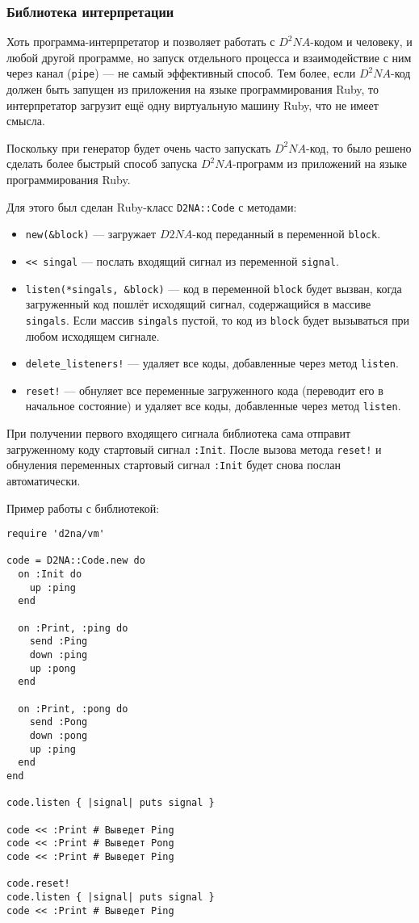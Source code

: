 \documentclass[utf8,a5paper,portrait,12pt]{eskdtext}
\begin{document}
\subsubsection{Библиотека интерпретации}

Хоть программа-интерпретатор и позволяет работать с $D^2NA$-кодом и человеку,
и любой другой программе, но запуск отдельного процесса и взаимодействие с ним
через канал (\texttt{pipe}) — не самый эффективный способ. Тем более, если
$D^2NA$-код должен быть запущен из приложения на языке программирования Ruby,
то интерпретатор загрузит ещё одну виртуальную машину Ruby, что не имеет смысла.

Поскольку при генератор будет очень часто запускать $D^2NA$-код, то было решено
сделать более быстрый способ запуска $D^2NA$-программ из приложений на языке
программирования Ruby.

Для этого был сделан Ruby-класс \texttt{D2NA::Code} с методами:
\begin{itemize}
  \item \texttt{new(\&block)} — загружает $D2NA$-код переданный в переменной
        \texttt{block}.
  \item \texttt{{<}< singal} — послать входящий сигнал из переменной
        \texttt{signal}.
  \item \texttt{listen(*singals, \&block)} — код в переменной \texttt{block} будет
        вызван, когда загруженный код пошлёт исходящий сигнал, содержащийся в
        массиве \texttt{singals}. Если массив \texttt{singals} пустой, то код из
        \texttt{block} будет вызываться при любом исходящем сигнале.
  \item \texttt{delete\_listeners!} — удаляет все коды, добавленные через метод
        \texttt{listen}.
  \item \texttt{reset!} — обнуляет все переменные загруженного кода
        (переводит его в начальное состояние) и удаляет все коды, добавленные
        через метод \texttt{listen}.
\end{itemize}

При получении первого входящего сигнала библиотека сама отправит загруженному
коду стартовый сигнал \texttt{:Init}. После вызова метода \texttt{reset!} и
обнуления переменных стартовый сигнал \texttt{:Init} будет снова послан
автоматически.

Пример работы с библиотекой:
\begin{verbatim}
require 'd2na/vm'

code = D2NA::Code.new do
  on :Init do
    up :ping
  end

  on :Print, :ping do
    send :Ping
    down :ping
    up :pong
  end

  on :Print, :pong do
    send :Pong
    down :pong
    up :ping
  end
end

code.listen { |signal| puts signal }

code << :Print # Выведет Ping
code << :Print # Выведет Pong
code << :Print # Выведет Ping

code.reset!
code.listen { |signal| puts signal }
code << :Print # Выведет Ping
\end{verbatim}
\end{document}
